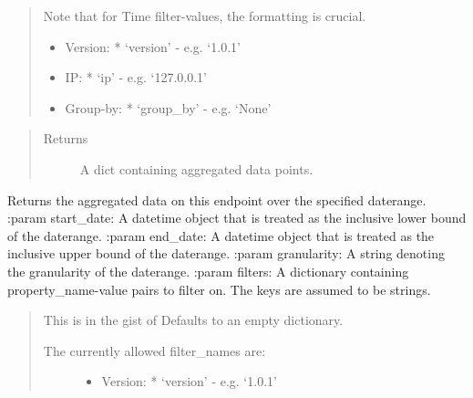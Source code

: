 \documentclass[letterpaper,10pt,english]{sphinxmanual}
\begin{document}
\begin{fulllineitems}
\begin{fulllineitems}
\begin{quote}
\begin{description}
\begin{itemize}
\end{itemize}

Note that for Time filter-values, the formatting is crucial.
\begin{itemize}
\item {} 
Version:
* ‘version’ - e.g. ‘1.0.1’

\item {} 
IP:
* ‘ip’ - e.g. ‘127.0.0.1’

\item {} 
Group-by:
* ‘group\_by’ - e.g. ‘None’

\end{itemize}

\end{description}
\end{quote}
\begin{quote}\begin{description}
\item[{Returns}] \leavevmode
A dict containing aggregated data points.

\end{description}\end{quote}

\end{fulllineitems}


\begin{fulllineitems}
\label{\detokenize{pydash_app.dashboard.endpoint:pydash_app.dashboard.endpoint.Endpoint.aggregated_data_daterange}}
Returns the aggregated data on this endpoint over the specified daterange.
:param start\_date: A datetime object that is treated as the inclusive lower bound of the daterange.
:param end\_date: A datetime object that is treated as the inclusive upper bound of the daterange.
:param granularity: A string denoting the granularity of the daterange.
:param filters: A dictionary containing property\_name-value pairs to filter on. The keys are assumed to be strings.
\begin{quote}

This is in the gist of 
Defaults to an empty dictionary.
\begin{description}
\item[{The currently allowed filter\_names are:}] \leavevmode\begin{itemize}
\item {} 
Version:
* ‘version’ - e.g. ‘1.0.1’


\end{itemize}
\end{description}
\end{quote}
\end{fulllineitems}
\end{fulllineitems}
\end{document}
